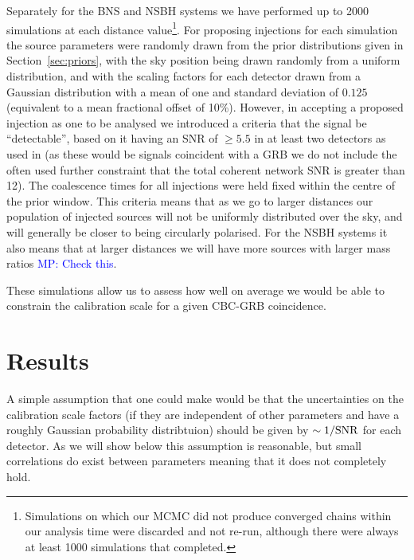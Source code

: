 \documentclass[10pt]{iopart}
\newcommand{\MP}[1]{\textcolor{blue}{MP: #1}}
\begin{document}
Separately for the \ac{BNS} and \ac{NSBH} systems we have performed up to 2000 simulations at each 
distance value\footnote{Simulations on which our MCMC did not produce converged chains within our 
analysis time were discarded and not re-run, although there were always at least 1000 simulations 
that completed.}. For proposing injections for each simulation the source parameters were randomly 
drawn from the prior distributions given in Section~\ref{sec:priors}, with the sky position being 
drawn randomly from a uniform distribution, and with the scaling factors for each detector drawn 
from a Gaussian distribution with a mean of one and standard deviation of $0.125$ (equivalent to a 
mean fractional offset of 10\%). However, in accepting a proposed injection as one to be analysed 
we introduced a criteria that the signal be ``detectable'', based on it having an SNR of $\geq 5.5$ 
in at least two detectors as used in \cite{2012PhRvD..85h2002A} (as these would be signals 
coincident with a GRB we do not include the often used further constraint that the total coherent 
network SNR is greater than 12). The coalescence times for all injections were held fixed 
within the centre of the prior window. This criteria means that as we go to larger distances our 
population of injected sources will not be uniformly distributed over the sky, and will generally 
be closer to being circularly polarised. For the \ac{NSBH} systems it also means that at larger 
distances we will have more sources with larger mass ratios \MP{Check this}.

These simulations allow us to assess how well on average we would be able to constrain the 
calibration scale for a given CBC-GRB coincidence.



\section{Results}\label{sec:results}

A simple assumption that one could make would be that the uncertainties on the calibration scale 
factors (if they are independent of other parameters and have a roughly Gaussian probability 
distribtuion)
should be given by $\sim 1/{\rm SNR}$ for each detector. As we will show below this assumption is 
reasonable, but small correlations do exist between parameters meaning that it does not completely 
hold.
\end{document}
